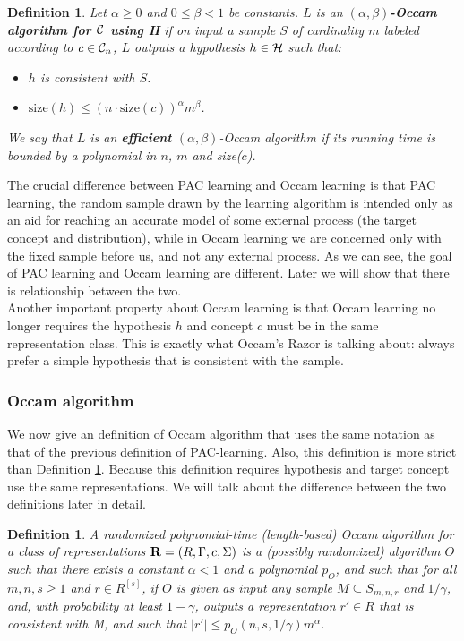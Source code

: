 \documentclass[12pt]{article}
\newtheorem{definition}[theorem]{Definition}
\newcommand{\calc}{{\cal C}}
\newcommand{\calh}{{\cal H}}
\begin{document}
\begin{definition} \label {definition:occam-learning}
  Let $\alpha \ge 0$ and $0 \le \beta < 1$ be constants. $L$ is an {\bf $(\alpha, \beta)$-Occam algorithm for $\calc$ using \calh} if on input a sample $S$ of cardinality $m$ labeled according to $c \in \calc_n$, $L$ outputs a hypothesis $h \in \calh$ such that:

\begin{itemize}
  \item $h$ is consistent with $S$.
  \item $\text {size}(h) \le (n \cdot \text {size}(c))^{\alpha}m^{\beta}$.
\end{itemize}

We say that $L$ is an {\bf efficient} $(\alpha, \beta)$-Occam algorithm if its running time is bounded by a polynomial in $n$, $m$ and size($c$).
\end{definition}

The crucial difference between PAC learning and Occam learning is that PAC learning, the random sample drawn by the learning algorithm is intended only as an aid for reaching an accurate model of some external process (the target concept and distribution), while in Occam learning we are concerned only with the fixed sample before us, and not any external process. As we can see, the goal of PAC learning and Occam learning are different. Later we will show that there is relationship between the two. \\

Another important property about Occam learning is that Occam learning no longer requires the hypothesis $h$ and concept $c$ must be in the same representation class. This is exactly what Occam's Razor is talking about: always prefer a simple hypothesis that is consistent with the sample.

\subsubsection{Occam algorithm}

We now give an definition of Occam algorithm that uses the same notation as that of the previous definition of PAC-learning. Also, this definition is more strict than Definition \ref {definition:occam-learning}. Because this definition requires hypothesis and target concept use the same representations. We will talk about the difference between the two definitions later in detail.

\begin{definition} \label{definition:occ}
A randomized polynomial-time (length-based) Occam algorithm for a class of representations ${\bf R} = (R, \Gamma, c, \Sigma)$ is a (possibly randomized) algorithm $O$ such that there exists a constant $\alpha < 1$ and a polynomial $p_O$, and such that for all $m, n, s \ge 1$ and $r \in R^{[s]}$, if $O$ is given as input any sample $M \subseteq S_{m,n,r}$ and $1 / \gamma$, and, with probability at least $1 - \gamma$, outputs a representation $r' \in R$ that is consistent with M, and such that $|r'| \le p_O(n, s, 1 / \gamma)m^{\alpha}$.
\end{definition}
\end{document}

